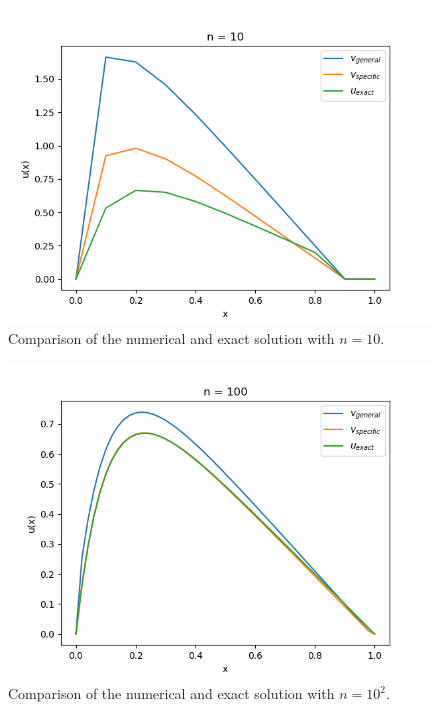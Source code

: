 \documentclass[english, nofootinbib]{revtex4-1}  %
\begin{document}
\newpage
\begin{figure}[h!]
        \centering 
        \includegraphics[scale=0.8]{FYS3150_oblig1_1.png} 
        \caption{Comparison of the numerical and exact solution with $n = 10$.}
        \label{fig:n=10}
\end{figure}

\begin{figure}[h!]
        \centering 
        \includegraphics[scale=0.8]{FYS3150_oblig1_2.png} 
        \caption{Comparison of the numerical and exact solution with $n = 10^2$.}
        \label{fig:n=100}
\end{figure}
\end{document}
